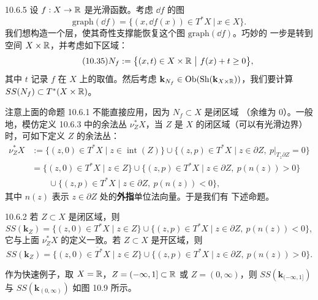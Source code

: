 \begin{wexam}{10.6.5}
设 $f:X\to\mathbb{R}$ 是光滑函数。考虑 $\dd f$ 的图
\[
  \mathrm{graph}(\dd f)
  =\bigl\{(x,\dd f(x))\in T^*X\ \big|\ x\in X\bigr\}.
\]
我们想构造一个层，使其奇性支撑能恢复这个图 $\mathrm{graph}(\dd f)$。巧妙的
一步是转到空间 $X\times\mathbb{R}$，并考虑如下区域：
\begin{equation}\tag{10.35}
  N_f:=\bigl\{(x,t)\in X\times\mathbb{R}\ \big|\ f(x)+t\ge0\bigr\},
\end{equation}
其中 $t$ 记录 $f$ 在 $X$ 上的取值。然后考虑
$\mathbf{k}_{N_f}\in\operatorname{Ob}(\operatorname{Sh}(\mathbf{k}_{X\times\mathbb{R}}))$，我们要计算
$SS(N_f)\subset T^*(X\times\mathbb{R})$。

注意上面的命题 10.6.1 不能直接应用，因为 $N_f\subset X$ 是闭区域
（余维为 $0$）。一般地，模仿定义 10.6.3 中的余法丛 $\nu^*_ZX$，当 $Z$ 是
$X$ 的闭区域（可以有光滑边界）时，可如下定义 $Z$ 的余法丛：
\begin{align*}
  \nu^*_ZX
  &:=\bigl\{(z,0)\in T^*X\mid z\in\operatorname{int}(Z)\bigr\}
   \cup\bigl\{(z,p)\in T^*X\mid z\in\partial Z,\ p|_{T_z\partial Z}=0\bigr\}\\
  &=\bigl\{(z,0)\in T^*X\mid z\in Z\bigr\}
   \cup\bigl\{(z,p)\in T^*X\mid z\in\partial Z,\ p(n(z))>0\bigr\}\\
  &\qquad\cup\bigl\{(z,p)\in T^*X\mid z\in\partial Z,\ p(n(z))<0\bigr\},
\end{align*}
其中 $n(z)$ 表示 $z\in\partial Z$ 处的\textbf{外指}单位法向量。于是我们有
下述命题。

\begin{wprop}{10.6.2}
若 $Z\subset X$ 是闭区域，则
\[
  SS(\mathbf{k}_Z)=\bigl\{(z,0)\in T^*X\mid z\in Z\bigr\}
  \cup\bigl\{(z,p)\in T^*X\mid z\in\partial Z,\ p(n(z))<0\bigr\},
\]
它与上面 $\nu^*_ZX$ 的定义一致。若 $Z\subset X$ 是开区域，则
\[
  SS(\mathbf{k}_Z)
  =\overline{\bigl\{(z,0)\in T^*X\mid z\in Z\bigr\}}
  \cup\bigl\{(z,p)\in T^*X\mid z\in\partial Z,\ p(n(z))>0\bigr\}.
\]
\end{wprop}


作为快速例子，取 $X=\mathbb{R}$，$Z=(-\infty,1]\subset\mathbb{R}$ 或 $Z=(0,\infty)$，则
$SS(\mathbf{k}_{(-\infty,1]})$ 与 $SS(\mathbf{k}_{(0,\infty)})$ 如图 10.9
所示。


\end{wexam}
